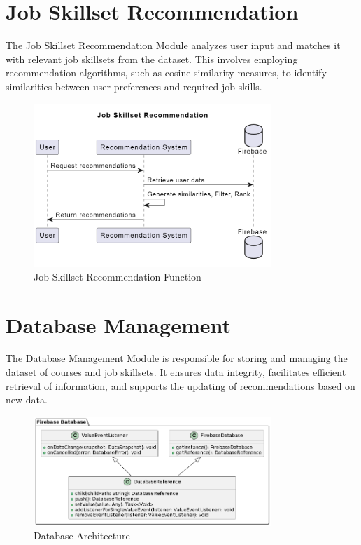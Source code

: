 \section{Job Skillset Recommendation}

The Job Skillset Recommendation Module analyzes user input and matches it with relevant job skillsets from the dataset. This involves employing recommendation algorithms, such as cosine similarity measures, to identify similarities between user preferences and required job skills.\\

\begin{figure}[t]
\centering
\includegraphics[width=0.8\textwidth]{3/skillset.png}
\caption{Job Skillset Recommendation Function}
\label{fig:job_skillset_recommendation}
\end{figure}

\section{Database Management}

The Database Management Module is responsible for storing and managing the dataset of courses and job skillsets. It ensures data integrity, facilitates efficient retrieval of information, and supports the updating of recommendations based on new data.\\

\begin{figure}[b]
\centering
\includegraphics[width=0.8\textwidth]{3/database.png}
\caption{Database Architecture}
\label{fig:database_architecture}
\end{figure}

